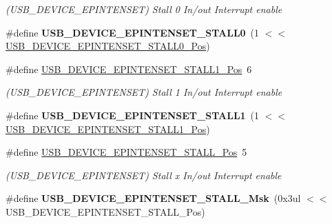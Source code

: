 \begin{DoxyCompactItemize}
\begin{DoxyCompactList}\small\item\em (U\+S\+B\+\_\+\+D\+E\+V\+I\+C\+E\+\_\+\+E\+P\+I\+N\+T\+E\+N\+S\+E\+T) Stall 0 In/out Interrupt enable \end{DoxyCompactList}\item 
\hypertarget{group___s_a_m_l21___u_s_b_ga654556e67670bc0974213b6d14f521fb}{}\#define {\bfseries U\+S\+B\+\_\+\+D\+E\+V\+I\+C\+E\+\_\+\+E\+P\+I\+N\+T\+E\+N\+S\+E\+T\+\_\+\+S\+T\+A\+L\+L0}~(1 $<$$<$ \hyperlink{group___s_a_m_l21___u_s_b_ga9d4e0dafc83af56ed91e31e805585a56}{U\+S\+B\+\_\+\+D\+E\+V\+I\+C\+E\+\_\+\+E\+P\+I\+N\+T\+E\+N\+S\+E\+T\+\_\+\+S\+T\+A\+L\+L0\+\_\+\+Pos})\label{group___s_a_m_l21___u_s_b_ga654556e67670bc0974213b6d14f521fb}

\item 
\hypertarget{group___s_a_m_l21___u_s_b_gad0872c85a0766d55328337d4692af92f}{}\#define \hyperlink{group___s_a_m_l21___u_s_b_gad0872c85a0766d55328337d4692af92f}{U\+S\+B\+\_\+\+D\+E\+V\+I\+C\+E\+\_\+\+E\+P\+I\+N\+T\+E\+N\+S\+E\+T\+\_\+\+S\+T\+A\+L\+L1\+\_\+\+Pos}~6\label{group___s_a_m_l21___u_s_b_gad0872c85a0766d55328337d4692af92f}

\begin{DoxyCompactList}\small\item\em (U\+S\+B\+\_\+\+D\+E\+V\+I\+C\+E\+\_\+\+E\+P\+I\+N\+T\+E\+N\+S\+E\+T) Stall 1 In/out Interrupt enable \end{DoxyCompactList}\item 
\hypertarget{group___s_a_m_l21___u_s_b_ga7630a54c68a2122b59566158dc6f6638}{}\#define {\bfseries U\+S\+B\+\_\+\+D\+E\+V\+I\+C\+E\+\_\+\+E\+P\+I\+N\+T\+E\+N\+S\+E\+T\+\_\+\+S\+T\+A\+L\+L1}~(1 $<$$<$ \hyperlink{group___s_a_m_l21___u_s_b_gad0872c85a0766d55328337d4692af92f}{U\+S\+B\+\_\+\+D\+E\+V\+I\+C\+E\+\_\+\+E\+P\+I\+N\+T\+E\+N\+S\+E\+T\+\_\+\+S\+T\+A\+L\+L1\+\_\+\+Pos})\label{group___s_a_m_l21___u_s_b_ga7630a54c68a2122b59566158dc6f6638}

\item 
\hypertarget{group___s_a_m_l21___u_s_b_ga45cc411fbe61df59b01df54ed2a6b1f9}{}\#define \hyperlink{group___s_a_m_l21___u_s_b_ga45cc411fbe61df59b01df54ed2a6b1f9}{U\+S\+B\+\_\+\+D\+E\+V\+I\+C\+E\+\_\+\+E\+P\+I\+N\+T\+E\+N\+S\+E\+T\+\_\+\+S\+T\+A\+L\+L\+\_\+\+Pos}~5\label{group___s_a_m_l21___u_s_b_ga45cc411fbe61df59b01df54ed2a6b1f9}

\begin{DoxyCompactList}\small\item\em (U\+S\+B\+\_\+\+D\+E\+V\+I\+C\+E\+\_\+\+E\+P\+I\+N\+T\+E\+N\+S\+E\+T) Stall x In/out Interrupt enable \end{DoxyCompactList}\item 
\hypertarget{group___s_a_m_l21___u_s_b_gade3dcb7bb02506b0a03fde9743612ac6}{}\#define {\bfseries U\+S\+B\+\_\+\+D\+E\+V\+I\+C\+E\+\_\+\+E\+P\+I\+N\+T\+E\+N\+S\+E\+T\+\_\+\+S\+T\+A\+L\+L\+\_\+\+Msk}~(0x3ul $<$$<$ U\+S\+B\+\_\+\+D\+E\+V\+I\+C\+E\+\_\+\+E\+P\+I\+N\+T\+E\+N\+S\+E\+T\+\_\+\+S\+T\+A\+L\+L\+\_\+\+Pos)\label{group___s_a_m_l21___u_s_b_gade3dcb7bb02506b0a03fde9743612ac6}


\end{DoxyCompactItemize}
